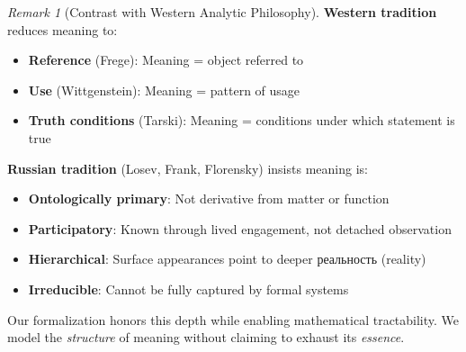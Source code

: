 \documentclass[11pt,a4paper]{article}
\theoremstyle{definition}
\theoremstyle{remark}
\newtheorem{remark}{Remark}[section]
\begin{document}
\begin{remark}[Contrast with Western Analytic Philosophy]
\textbf{Western tradition} reduces meaning to:
\begin{itemize}
    \item \textbf{Reference} (Frege): Meaning = object referred to
    \item \textbf{Use} (Wittgenstein): Meaning = pattern of usage
    \item \textbf{Truth conditions} (Tarski): Meaning = conditions under which statement is true
\end{itemize}

\textbf{Russian tradition} (Losev, Frank, Florensky) insists meaning is:
\begin{itemize}
\item \textbf{Ontologically primary}: Not derivative from matter or function
\item \textbf{Participatory}: Known through lived engagement, not detached observation
\item \textbf{Hierarchical}: Surface appearances point to deeper реальность (reality)
\item \textbf{Irreducible}: Cannot be fully captured by formal systems
\end{itemize}

Our formalization honors this depth while enabling mathematical tractability. We model the \textit{structure} of meaning without claiming to exhaust its \textit{essence}.
\end{remark}
\end{document}
